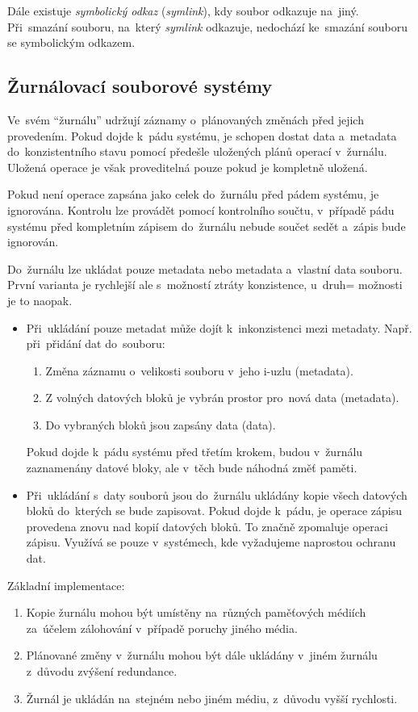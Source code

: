 Dále existuje \emph{symbolický odkaz} (\emph{symlink}), kdy soubor odkazuje na~jiný. Při~smazání souboru, na~který \emph{symlink} odkazuje, nedochází ke~smazání souboru se symbolickým odkazem.

\subsection{Žurnálovací souborové systémy}

Ve~svém \enquote{žurnálu} udržují záznamy o~plánovaných změnách před jejich provedením. Pokud dojde k~pádu systému, je schopen dostat data a~metadata do~konzistentního stavu pomocí předešle uložených plánů operací v~žurnálu. Uložená operace je však proveditelná pouze pokud je kompletně uložená.

Pokud není operace zapsána jako celek do~žurnálu před pádem systému, je ignorována. Kontrolu lze provádět pomocí kontrolního součtu, v~případě pádu systému před kompletním zápisem do~žurnálu nebude součet sedět a~zápis bude ignorován.

Do~žurnálu lze ukládat pouze metadata nebo metadata a~vlastní data souboru. První varianta je rychlejší ale s~možností ztráty konzistence, u~druh= možnosti je to naopak.

\begin{itemize}[noitemsep]
	\item Při~ukládání pouze metadat může dojít k~inkonzistenci mezi metadaty. Např. při~přidání dat do~souboru:
	\begin{enumerate}[noitemsep]
		\item Změna záznamu o~velikosti souboru v~jeho i-uzlu (metadata).
		\item Z volných datových bloků je vybrán prostor pro~nová data (metadata).
		\item Do vybraných bloků jsou zapsány data (data).
	\end{enumerate}
	Pokud dojde k~pádu systému před třetím krokem, budou v~žurnálu zaznamenány datové bloky, ale v~těch bude náhodná změť paměti.
	\item Při~ukládání s~daty souborů jsou do~žurnálu ukládány kopie všech datových bloků do~kterých se bude zapisovat. Pokud dojde k~pádu, je operace zápisu provedena znovu nad kopií datových bloků. To značně zpomaluje operaci zápisu. Využívá se pouze v~systémech, kde vyžadujeme naprostou ochranu dat.
\end{itemize}

Základní implementace:

\begin{enumerate}[noitemsep]
	\item Kopie žurnálu mohou být umístěny na~různých paměťových médiích za~účelem zálohování v~případě poruchy jiného média.
	\item Plánované změny v~žurnálu mohou být dále ukládány v~jiném žurnálu z~důvodu zvýšení redundance.
	\item Žurnál je ukládán na~stejném nebo jiném médiu, z~důvodu vyšší rychlosti.
\end{enumerate}

